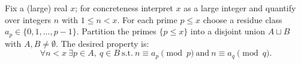 Fix a (large) real $x$; for concreteness interpret $x$ as a large integer and quantify over integers $n$ with $1\le n<x$. For each prime $p\le x$ choose a residue class $a_p\in\{0,1,\dots,p-1\}$. Partition the primes $\{p\le x\}$ into a disjoint union $A\sqcup B$ with $A,B\ne\emptyset$. The desired property is:
\[
\forall n<x\ \exists p\in A,\ q\in B\ \text{s.t.}\ n\equiv a_p\pmod p\ \text{and}\ n\equiv a_q\pmod q.
\]
